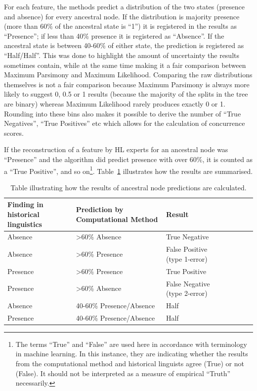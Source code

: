 \documentclass[12pt,letterpaper]{article}
\begin{document}
For each feature, the methods predict a distribution of the two states (presence and absence) for every ancestral node. If the distribution is majority presence (more than 60\% of the ancestral state is ``1'') it is registered in the results as ``Presence''; if less than 40\% presence it is registered as ``Absence''. If the ancestral state is between 40-60\% of either state, the prediction is registered as ``Half/Half''. This was done to highlight the amount of uncertainty the results sometimes contain, while at the same time making it a fair comparison between Maximum Parsimony and Maximum Likelihood. Comparing the raw distributions themselves is not a fair comparison because Maximum Parsimony is always more likely to suggest 0, 0.5 or 1 results (because the majority of the splits in the tree are binary) whereas Maximum Likelihood rarely produces exactly 0 or 1. Rounding into these bins also makes it possible to derive the number of ``True Negatives'', ``True Positives'' etc which allows for the calculation of concurrence scores.

If the reconstruction of a feature by HL experts for an ancestral node was ``Presence'' and the algorithm did predict presence with over 60\%, it is counted as a ``True Positive'', and so on\footnote{The terms ``True'' and ``False'' are used here in accordance with terminology in machine learning. In this instance, they are indicating whether the results from the computational method and historical linguists agree (True) or not (False). It should not be interpreted as a measure of empirical ``Truth'' necessarily.}. Table~\ref{example_HL_prediction_table_true_positives} illustrates how the results are summarised.

\begin{table}[ht]
\centering
\caption{Table illustrating how the results of ancestral node predictions are calculated.}
\label{example_HL_prediction_table_true_positives}
\begin{tabular}{|p{4cm}|p{6cm}|p{6cm}|l|l|l|l|l|}
\hline
\textbf{Finding in historical linguistics} & \textbf{Prediction by Computational Method} & \textbf{Result} \\ \hline
Absence & >60\% Absence & True Negative \\ \hline
Absence & >60\% Presence & False Positive (type 1-error) \\ \hline
Presence & >60\% Presence & True Positive \\ \hline
Presence & >60\% Absence & False Negative (type 2-error) \\ \hline
Absence & 40-60\% Presence/Absence & Half \\ \hline
Presence & 40-60\% Presence/Absence & Half\\ \hline
\end{tabular}
\end{table}
\end{document}

